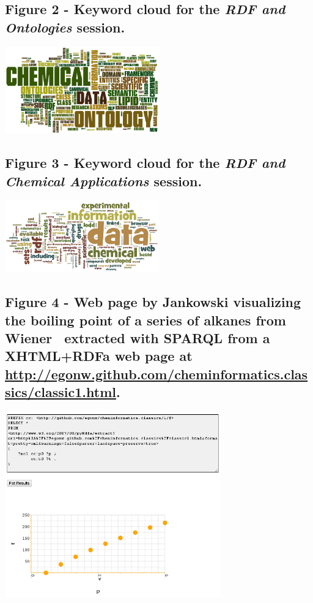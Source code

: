 \documentclass[10pt]{bmc_article}
\newenvironment{bmcformat}{\begin{raggedright}\baselineskip20pt\sloppy\setboolean{publ}{false}}{\end{raggedright}\baselineskip20pt\sloppy}
\begin{document}
\begin{bmcformat}
  \subsection*{Figure 2 - Keyword cloud for the \textit{RDF and Ontologies} session.}
  \label{fig:wordle2}
  \includegraphics[width=0.5\textwidth]{graphics/wordle_cinf0031} 

  \subsection*{Figure 3 - Keyword cloud for the \textit{RDF and Chemical Applications} session.}
  \label{fig:wordle3}
  \includegraphics[width=0.5\textwidth]{graphics/wordle_cinf0032} 

  \subsection*{Figure 4 - Web page by Jankowski visualizing the boiling point of a series of
  alkanes from Wiener~\cite{Wiener1947} extracted with SPARQL from a XHTML+RDFa web page at
  \url{http://egonw.github.com/cheminformatics.classics/classic1.html}.}
  \label{fig:bpSparql}
  \includegraphics[width=0.7\textwidth]{graphics/sparqlGraphing1} 


\end{bmcformat}
\end{document}
